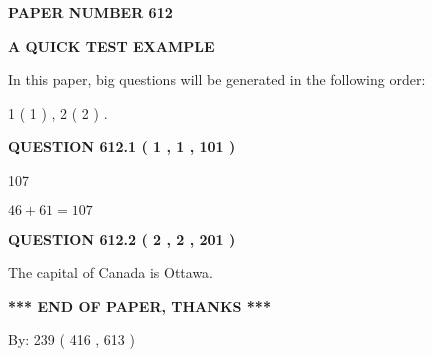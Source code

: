 \documentclass[12pt]{article}
\begin{document}
   
 {\textbf{ \Large{ PAPER NUMBER  612  }}}
   
   
\vspace{0.2in}
   
   
   
   
   
   
 \vspace{0.2in}
{\LARGE {\textbf{ A QUICK TEST EXAMPLE}}}
   
   
   
\vspace{0.2in}
   
In this paper, big questions will be generated in the following order: 
   
   
   1 ( 1 )
 ,
   2 ( 2 )
 .
  
\vspace{0.2in}
  
{\textbf{\Large{QUESTION
612.1 
 ( 1 , 1 , 101 )
}}}
  
  
 
 
\noindent{}

107
 
 
 
 
\noindent{}

$ %
46 +  %
61=   %
107$
 
 
  
\vspace{0.2in}
  
{\textbf{\Large{QUESTION
612.2 
 ( 2 , 2 , 201 )
}}}
  
  
 
 
\noindent{}
 
 
The capital of Canada is Ottawa.
 
 
 
 
   
   
 \vspace{0.2in}
 
   
   
   
   
\vspace{1.0in} 
{\textbf{\large{ *** END OF PAPER, THANKS *** }}} 
   
   
\hspace{1.0in} By: 
 239 ( 416 ,  613 )
   
\end{document}
